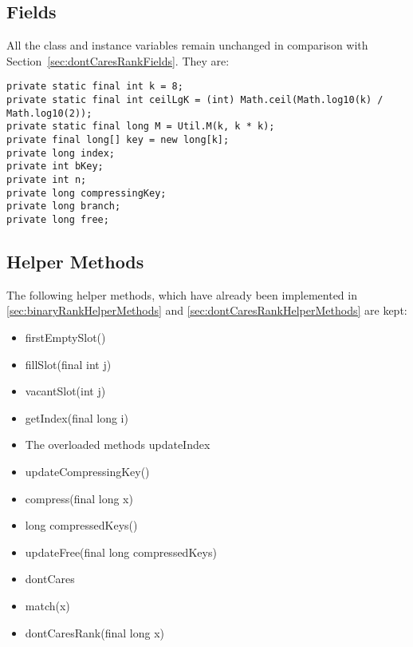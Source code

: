 \subsection{Fields} \label{sec:dontCaresInsertFields}

All the class and instance variables remain unchanged in comparison with Section~\ref{sec:dontCaresRankFields}. They are:
\begin{lstlisting}
private static final int k = 8;
private static final int ceilLgK = (int) Math.ceil(Math.log10(k) / Math.log10(2));
private static final long M = Util.M(k, k * k);
private final long[] key = new long[k];
private long index;
private int bKey;
private int n;
private long compressingKey;
private long branch;
private long free;
\end{lstlisting}

\subsection{Helper Methods} \label{sec:dontCaresInsertHelperMethods}

The following helper methods, which have already been implemented in \ref{sec:binaryRankHelperMethods} and \ref{sec:dontCaresRankHelperMethods} are kept:
\begin{itemize}
    \item
    {\ttfamily firstEmptySlot()}
    
    \item
    {\ttfamily fillSlot(final int j)}
    
    \item
    {\ttfamily vacantSlot(int j)}
    
    \item
    {\ttfamily getIndex(final long i)}
    
    \item
    The overloaded methods {\ttfamily updateIndex}
    
    \item
    {\ttfamily updateCompressingKey()}
    
    \item
    {\ttfamily compress(final long x)}
    
    \item
    {\ttfamily long compressedKeys()}
    
    \item
    {\ttfamily updateFree(final long compressedKeys)}
    
    \item
    {\ttfamily dontCares}
    
    \item
    {\ttfamily match(x)}
    
    \item
    {\ttfamily dontCaresRank(final long x)}
    
\end{itemize}


